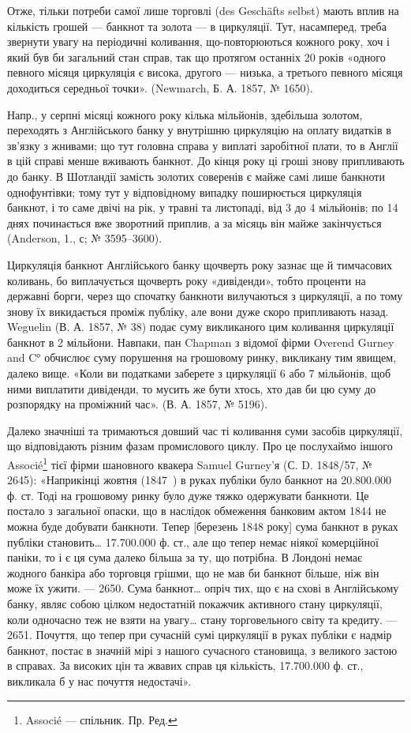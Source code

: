 Отже, тільки потреби самої лише торговлі (des Geschäfts selbst) мають
вплив на кількість грошей — банкнот та золота — в циркуляції. Тут, насамперед,
треба звернути увагу на періодичні коливання, що-повторюються кожного року,
хоч і який був би загальний стан справ, так що протягом останніх 20 років
«одного певного місяця циркуляція є висока, другого — низька, а третього певного
місяця доходиться середньої точки». (Newmarch, Б. А. 1857, № 1650).

Напр., у серпні місяці кожного року кілька мільйонів, здебільша золотом,
переходять з Англійського банку у внутрішню циркуляцію на оплату видатків
в зв’язку з жнивами; що тут головна справа у виплаті заробітної плати, то
в Англії в цій справі менше вживають банкнот. До кінця року ці гроші знову
припливають до банку. В Шотландії замість золотих соверенів є майже самі лише
банкноти однофунтівки; тому тут у відповідному випадку поширюється циркуляція
банкнот, і то саме двічі на рік, у травні та листопаді, від 3 до 4 мільйонів;
по 14 днях починається вже зворотний приплив, а за місяць він майже закінчується
(Anderson, 1., с; № 3595--3600).

Циркуляція банкнот Англійського банку щочверть року зазнає ще й
тимчасових коливань, бо виплачується щочверть року «дивіденди», тобто проценти
на державні борги, через що спочатку банкноти вилучаються з циркуляції,
а по тому знову їх викидається проміж публіку, але вони дуже скоро припливають
назад. Weguelin (В. А. 1857, № 38) подає суму викликаного цим коливання
циркуляції банкнот в 2 мільйони. Навпаки, пан Chapman з відомої фірми
Overend Gurney and C° обчислює суму порушення на грошовому ринку, викликану
тим явищем, далеко вище. «Коли ви податками заберете з циркуляції 6 або
7 мільйонів, щоб ними виплатити дивіденди, то мусить же бути хтось, хто дав
би цю суму до розпорядку на проміжний час». (В. А. 1857, № 5196).

Далеко значніші та тримаються довший час ті коливання суми засобів
циркуляції, що відповідають різним фазам промислового циклу. Про це послухаймо
іншого Associé\footnote*{
Associé — спільник. Пр. Ред.
} тієї фірми шановного квакера Samuel Gurney’я (С. D.
1848/57, № 2645): «Наприкінці жовтня (1847~) в руках публіки було банкнот
на 20.800.000 ф. ст. Тоді на грошовому ринку було дуже тяжко одержувати
банкноти. Це постало з загальної опаски, що в наслідок обмеження банковим
актом 1844 не можна буде добувати банкноти. Тепер [березень 1848 року] сума
банкнот в руках публіки становить\dots{} 17.700.000 ф. ст., але що тепер немає
ніякої комерційної паніки, то і є ця сума далеко більша за ту, що потрібна.
В Лондоні немає жодного банкіра або торговця грішми, що не мав би банкнот
більше, ніж він може їх ужити. — 2650. Сума банкнот\dots{} опріч тих, що є на
схові в Англійському банку, являє собою цілком недостатній покажчик активного
стану циркуляції, коли одночасно теж не взяти на увагу\dots{} стану торговельного
світу та кредиту. — 2651. Почуття, що тепер при сучасній сумі циркуляції в
руках публіки є надмір банкнот, постає в значній мірі з нашого сучасного становища,
з великого застою в справах. За високих цін та жвавих справ ця
кількість, 17.700.000 ф. ст., викликала б у нас почуття недостачі».
